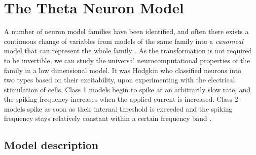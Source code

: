 \newpage
\section{The Theta Neuron Model} \label{TheThetaNeuronModel}
A number of neuron model families have been identified, and often there exists a continuous change of variables from models of the same family into a \textit{canonical} model that can represent the whole family \cite{Hoppensteadt2001CanonicalNM}. As the transformation is not required to be invertible, we can study the universal neurocomputational properties of the family in a low dimensional model.
It was Hodgkin \cite{Hodgkin1948} who classified neurons into two types based on their excitability, upon experimenting with the electrical stimulation of cells. Class 1 models begin to spike at an arbitrarily slow rate, and the spiking frequency increases when the applied current is increased. Class 2 models spike as soon as their internal threshold is exceeded and the spiking frequency stays relatively constant within a certain frequency band \cite{Hoppensteadt2001CanonicalNM}.

\subsection{Model description} \label{sec:TheThetaNeuronModelDescription}

